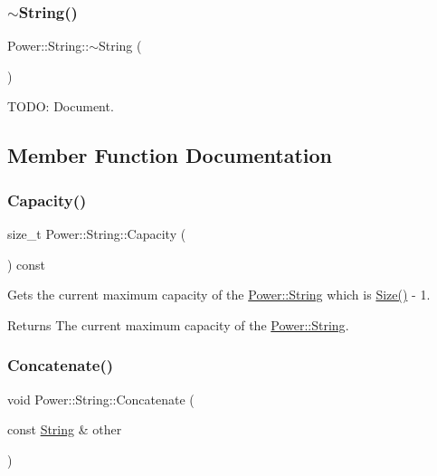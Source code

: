\subsubsection{\texorpdfstring{$\sim$\+String()}{~String()}}
{\footnotesize\ttfamily Power\+::\+String\+::$\sim$\+String (\begin{DoxyParamCaption}{ }\end{DoxyParamCaption})\hspace{0.3cm}{\ttfamily [inline]}}



T\+O\+DO\+: Document. 



\subsection{Member Function Documentation}
\mbox{\label{class_power_1_1_string_aa25a140140cd4fe69b04d70a794c8394}} 
\subsubsection{\texorpdfstring{Capacity()}{Capacity()}}
{\footnotesize\ttfamily size\+\_\+t Power\+::\+String\+::\+Capacity (\begin{DoxyParamCaption}{ }\end{DoxyParamCaption}) const\hspace{0.3cm}{\ttfamily [inline]}}



Gets the current maximum capacity of the \hyperlink{class_power_1_1_string}{Power\+::\+String} which is \hyperlink{class_power_1_1_string_aa62245fcf9bd8261b4b13c558dc45daf}{Size()} -\/ 1. 

\begin{DoxyReturn}{Returns}
The current maximum capacity of the \hyperlink{class_power_1_1_string}{Power\+::\+String}. 
\end{DoxyReturn}
\mbox{\label{class_power_1_1_string_a06e6def1040275302b2ea78e6ceb05e6}} 
\subsubsection{\texorpdfstring{Concatenate()}{Concatenate()}\hspace{0.1cm}{\footnotesize\ttfamily [1/4]}}
{\footnotesize\ttfamily void Power\+::\+String\+::\+Concatenate (\begin{DoxyParamCaption}\item[{const \hyperlink{class_power_1_1_string}{String} \&}]{other }\end{DoxyParamCaption})\hspace{0.3cm}{\ttfamily [inline]}}



